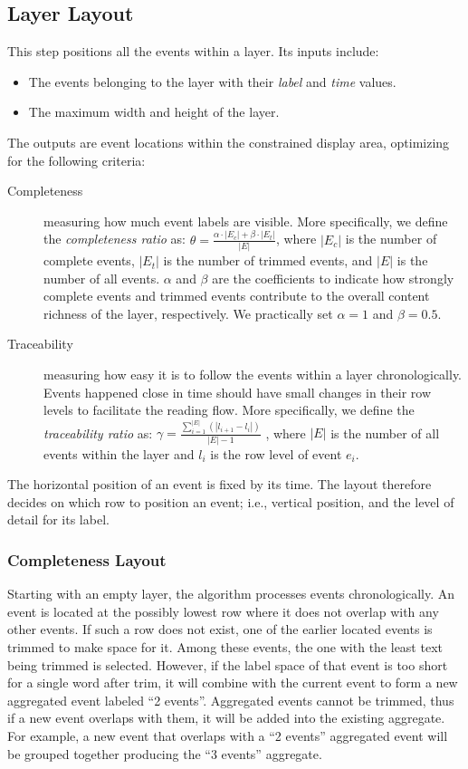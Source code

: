 \subsection{Layer Layout}
This step positions all the events within a layer. Its inputs include:
\begin{itemize}
	\item The events belonging to the layer with their \emph{label} and \emph{time} values.
	\item The maximum width and height of the layer.
\end{itemize}
The outputs are event locations within the constrained display area, optimizing for the following criteria:
\begin{description}
	\item[Completeness] measuring how much event labels are visible. More specifically, we define the \emph{completeness ratio} as:
	$\theta = \frac{\alpha \cdot |E_c| + \beta \cdot |E_t|}{|E|}$, where $|E_c|$ is the number of complete events, $|E_t|$ is the number of trimmed events, and $|E|$ is the number of all events. $\alpha$ and $\beta$ are the coefficients to indicate how strongly complete events and trimmed events contribute to the overall content richness of the layer, respectively. We practically set $\alpha=1$ and $\beta=0.5$.

	\item[Traceability] measuring how easy it is to follow the events within a layer chronologically. Events happened close in time should have small changes in their row levels to facilitate the reading flow. More specifically, we define the \emph{traceability ratio} as:
	$\gamma=\frac{\sum\limits_{i=1}^{|E|}(|l_{i+1} - l_i|)}{|E|-1}$	, where $|E|$ is the number of all events within the layer and $l_i$ is the row level of event $e_i$.
\end{description}

The horizontal position of an event is fixed by its time. The layout therefore decides on which row to position an event; i.e., vertical position, and the level of detail for its label.

\subsubsection{Completeness Layout}
Starting with an empty layer, the algorithm processes events chronologically. An event is located at the possibly lowest row where it does not overlap with any other events. If such a row does not exist, one of the earlier located events is trimmed to make space for it. Among these events, the one with the least text being trimmed is selected. However, if the label space of that event is too short for a single word after trim, it will combine with the current event to form a new aggregated event labeled ``2 events''. Aggregated events cannot be trimmed, thus if a new event overlaps with them, it will be added into the existing aggregate. For example, a new event that overlaps with a ``2 events'' aggregated event will be grouped together producing the ``3 events'' aggregate.

